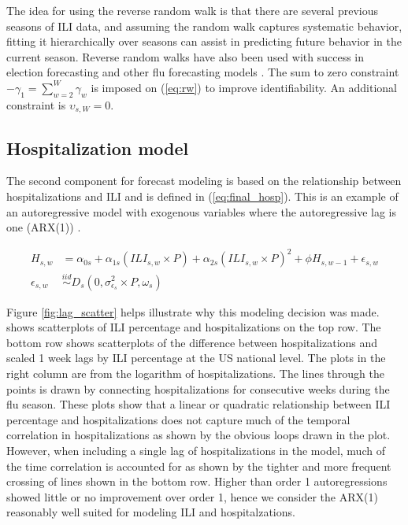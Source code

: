 The idea for using the reverse random walk is that there are several previous 
seasons of ILI data, and assuming the random walk captures systematic behavior, 
fitting it hierarchically over seasons can assist in predicting future behavior 
in the current season. 
Reverse random walks have also been used with success in election forecasting 
and other flu forecasting models \cite[]{osthus2021multiscale, 
osthus2019dynamic, linzer2013dynamic}. The sum to zero constraint 
$-\gamma_1 = \sum_{w=2}^W \gamma_w$ is imposed on (\ref{eq:rw}) to improve 
identifiability. An additional constraint is $\upsilon_{s, W} = 0$.









\subsection{Hospitalization model} \label{sec:hospital_model}

The second component for forecast modeling is based on the relationship between 
hospitalizations and ILI and is defined in (\ref{eq:final_hosp}).
This is an example of an autoregressive model with exogenous variables where 
the autoregressive lag is one (ARX(1)) 
\cite[]{raftery2010online,ljung1987system}. 

\begin{equation}
    \begin{aligned}
    \label{eq:final_hosp}
    H_{s,w} &= \alpha_{0s} + \alpha_{1s} (ILI_{s,w} \times P) + \alpha_{2s} 
    (ILI_{s,w} \times P)^2 + \phi H_{s,w-1} + \epsilon_{s,w}\\ 
    \epsilon_{s,w} &\overset{iid}{\sim} D_s(0, \sigma_{\epsilon_s}^2 \times P, 
    \omega_s) %
    \end{aligned}
\end{equation}

Figure \ref{fig:lag_scatter} helps
illustrate why this modeling decision was made.
shows scatterplots of ILI percentage and hospitalizations on the top row.
The bottom row shows scatterplots of the difference between hospitalizations and 
scaled 1 week 
lags by ILI percentage at the US national level. The plots in the right column
are from the logarithm of hospitalizations. The lines through the points is
drawn by connecting hospitalizations for consecutive weeks during the flu 
season.
These plots show that a linear or quadratic relationship between ILI percentage 
and hospitalizations does not capture much of the temporal correlation in 
hospitalizations as shown by the obvious loops drawn in the plot. 
However, when including a 
single lag of hospitalizations in the model, much of the time correlation is
accounted for as shown by the tighter and more frequent crossing of lines shown
in the bottom row. Higher than order 1 autoregressions showed little or no 
improvement over order 1, hence we consider the ARX(1) reasonably well 
suited for modeling ILI and hospitalzations. 

